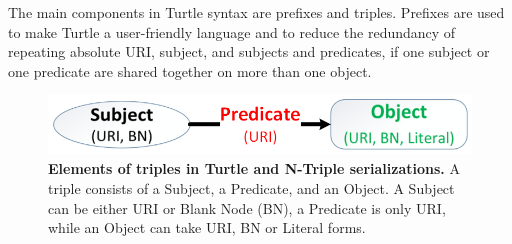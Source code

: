 The main components in Turtle syntax are prefixes and triples. 
Prefixes are used to make Turtle a user-friendly language and to reduce the redundancy of repeating absolute URI, subject, and subjects and predicates, if one subject or one predicate are shared together on more than one object. 

\begin{figure}[ht]
	\begin{center}
		\includegraphics[scale=0.4,angle=0]{images/TurtleandNtripleElements.png}
				\setlength\belowcaptionskip{-5mm}
		\caption{\textbf{ Elements of triples in Turtle and N-Triple serializations.} A triple consists of a Subject, a Predicate, and an Object. A Subject can be either URI or Blank Node (BN), a Predicate is only URI, while an Object can take URI, BN or Literal forms.}
		\label{Fig:TurtleandNtripleElements}
	\end{center}
\end{figure}

